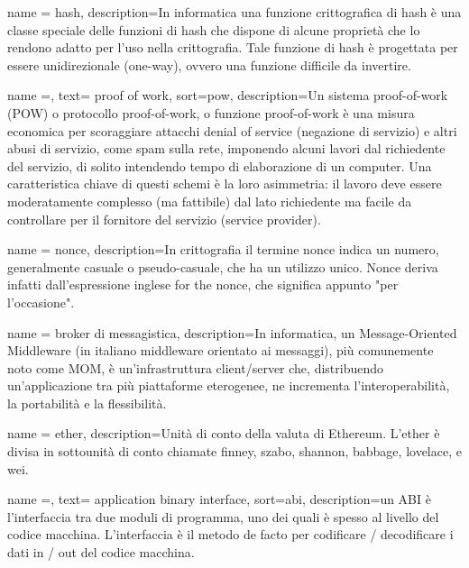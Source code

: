 {
    name = {hash},
    description={In informatica una funzione crittografica di hash è una classe speciale delle funzioni di hash che dispone di alcune proprietà che lo rendono adatto per l'uso nella crittografia. Tale funzione di hash è progettata per essere unidirezionale (one-way), ovvero una funzione difficile da invertire. }
}


{
    name =,
    text= proof of work,
    sort=pow,
    description={Un sistema proof-of-work (POW) o protocollo proof-of-work, o funzione proof-of-work è una misura economica per scoraggiare attacchi denial of service (negazione di servizio) e altri abusi di servizio, come spam sulla rete, imponendo alcuni lavori dal richiedente del servizio, di solito intendendo tempo di elaborazione di un computer. Una caratteristica chiave di questi schemi è la loro asimmetria: il lavoro deve essere moderatamente complesso (ma fattibile) dal lato richiedente ma facile da controllare per il fornitore del servizio (service provider). }
}


{
    name = {nonce},
    description={In crittografia il termine nonce indica un numero, generalmente casuale o pseudo-casuale, che ha un utilizzo unico. Nonce deriva infatti dall'espressione inglese for the nonce, che significa appunto "per l'occasione".}
}


{
    name = {broker di messagistica},
    description={In informatica, un Message-Oriented Middleware (in italiano middleware orientato ai messaggi), più comunemente noto come MOM, è un'infrastruttura client/server che, distribuendo un'applicazione tra più piattaforme eterogenee, ne incrementa l'interoperabilità, la portabilità e la flessibilità. }
}



{
    name = {ether},
    description={Unità di conto della valuta di Ethereum.  L'ether è divisa in sottounità di conto chiamate finney, szabo, shannon, babbage, lovelace, e wei.}
}


{
    name =,
    text= application binary interface,
    sort=abi,
    description={un ABI è l'interfaccia tra due moduli di programma, uno dei quali è spesso al livello del codice macchina. L'interfaccia è il metodo de facto per codificare / decodificare i dati in / out del codice macchina.}
}
